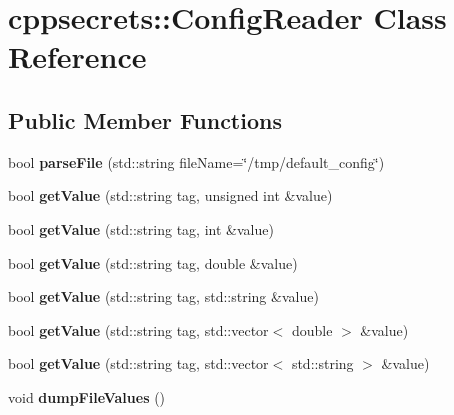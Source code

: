 \hypertarget{classcppsecrets_1_1ConfigReader}{\section{cppsecrets\-:\-:Config\-Reader Class Reference}
\label{classcppsecrets_1_1ConfigReader}
}
\subsection*{Public Member Functions}
\begin{DoxyCompactItemize}
\item 
\hypertarget{classcppsecrets_1_1ConfigReader_afffd5f9aae8203d9a5a8e0bd6d66fa4e}{bool {\bfseries parse\-File} (std\-::string file\-Name=\char`\"{}/tmp/default\-\_\-config\char`\"{})}\label{classcppsecrets_1_1ConfigReader_afffd5f9aae8203d9a5a8e0bd6d66fa4e}

\item 
\hypertarget{classcppsecrets_1_1ConfigReader_a952e033776eb137d0bd10a42a7c287d9}{bool {\bfseries get\-Value} (std\-::string tag, unsigned int \&value)}\label{classcppsecrets_1_1ConfigReader_a952e033776eb137d0bd10a42a7c287d9}

\item 
\hypertarget{classcppsecrets_1_1ConfigReader_ae0f7c8eb8e59b056bf5f8c34e7011f96}{bool {\bfseries get\-Value} (std\-::string tag, int \&value)}\label{classcppsecrets_1_1ConfigReader_ae0f7c8eb8e59b056bf5f8c34e7011f96}

\item 
\hypertarget{classcppsecrets_1_1ConfigReader_a583f489ef7d368e0a36cecd9e9fc01ff}{bool {\bfseries get\-Value} (std\-::string tag, double \&value)}\label{classcppsecrets_1_1ConfigReader_a583f489ef7d368e0a36cecd9e9fc01ff}

\item 
\hypertarget{classcppsecrets_1_1ConfigReader_a52ef0f7c23f8fa974de583d7a98b887a}{bool {\bfseries get\-Value} (std\-::string tag, std\-::string \&value)}\label{classcppsecrets_1_1ConfigReader_a52ef0f7c23f8fa974de583d7a98b887a}

\item 
\hypertarget{classcppsecrets_1_1ConfigReader_a6721535bce113f48b476ffd7d22630d2}{bool {\bfseries get\-Value} (std\-::string tag, std\-::vector$<$ double $>$ \&value)}\label{classcppsecrets_1_1ConfigReader_a6721535bce113f48b476ffd7d22630d2}

\item 
\hypertarget{classcppsecrets_1_1ConfigReader_a07267f92277cdd88200ae1826909d3fa}{bool {\bfseries get\-Value} (std\-::string tag, std\-::vector$<$ std\-::string $>$ \&value)}\label{classcppsecrets_1_1ConfigReader_a07267f92277cdd88200ae1826909d3fa}

\item 
\hypertarget{classcppsecrets_1_1ConfigReader_a980f4b314109eb3cd3fb32dabd8788d3}{void {\bfseries dump\-File\-Values} ()}\label{classcppsecrets_1_1ConfigReader_a980f4b314109eb3cd3fb32dabd8788d3}

\end{DoxyCompactItemize}
